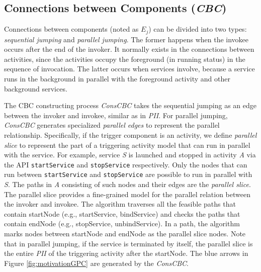 \subsection{Connections between Components (\textit{CBC})}
Connections between components (noted as $E_j$) can be divided into two types: \textit{sequential jumping} and \textit{parallel jumping}. The former happens when the invokee occurs after the end of the invoker. It normally exists in the connections between activities, since the activities occupy the foreground (in running status) in the sequence of invocation. The latter occurs when services involve, because a service runs in the background in parallel with the foreground activity and other background services. 

The CBC constructing process \textit{ConsCBC} takes the sequential jumping as an edge between the invoker and invokee, similar as in \textit{PII}. For parallel jumping, \textit{ConsCBC} generates specialized \textit{parallel edges} to represent the parallel relationship. 
Specifically, if the trigger component is an activity, we define \textit{parallel slice} to represent the part of a triggering activity model that can run in parallel with the service. For example, service \textit{S} is launched and stopped in activity \textit{A} via the API \texttt{startService} and \texttt{stopService} respectively. Only the nodes that can run between \texttt{startService} and \texttt{stopService} are possible to run in parallel with \textit{S}. The paths in \textit{A} consisting of such nodes and their edges are the \textit{parallel slice}. The parallel slice provides a fine-grained model for the parallel relation between the invoker and invokee. 
The algorithm traverses all the feasible paths that contain startNode (e.g., startService, bindService) and checks the paths that contain endNode (e.g., stopService, unbindService). In a path, the algorithm marks nodes between startNode and endNode as the parallel slice nodes. Note that in parallel jumping, if the service is terminated by itself, the parallel slice is the entire \textit{PII} of the triggering activity after the startNode.
The blue arrows in Figure \ref{fig:motivationGPC} are generated by the \textit{ConsCBC}. 

